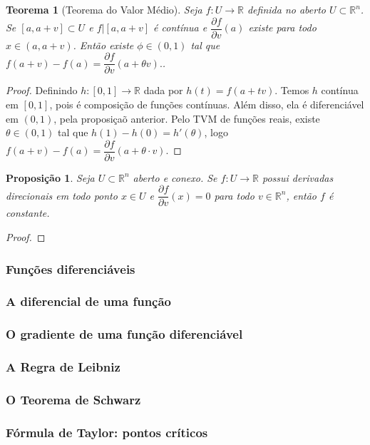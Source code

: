 \documentclass{article}
\newtheorem{prop}{Proposição}[section]
\theoremstyle{theorem}
\newtheorem{teo}{Teorema}
\theoremstyle{lemma}
\theoremstyle{definition}
\theoremstyle{remark}
\begin{document}
   \begin{teo}[Teorema do Valor Médio]
	   Seja \( f: U \to \mathbb{R}\) definida no aberto \( U \subset \mathbb{R}^n\). Se \( [a,a+v]\subset U\) e \(f|[a,a+v]\) é contínua e \( \dfrac{\partial f}{\partial v}(a)\) existe para todo \( x\in (a,a+v)\). Então existe \(\phi\in(0,1) \) tal que \( f(a+v) - f(a) = \dfrac{\partial f}{\partial v}(a+\theta v).\).
   \end{teo}
   \begin{proof}
	   Definindo \(h: [0,1] \to \mathbb{R}\) dada por \( h(t) = f(a+tv) \). Temos \(h\) contínua em \( [0,1]\), pois é composição de funções contínuas. Além disso, ela é diferenciável em \((0,1)\), pela proposiçaõ anterior. Pelo TVM de funções reais, existe \( \theta\in (0,1) \) tal que \( h(1) - h(0) = h'(\theta)\), logo \( f(a+v) - f(a) = \dfrac{\partial f}{\partial v}(a+\theta\cdot v) \).
   \end{proof}
   \begin{prop}
	   Seja \( U \subset \mathbb{R}^n \) aberto e conexo. Se \( f: U \to \mathbb{R} \) possui derivadas direcionais em todo ponto \(x\in U\) e \( \dfrac{\partial f}{\partial v} (x) = 0 \) para todo \(v\in \mathbb{R}^n \), então \(f \) é constante.
   \end{prop}
   \begin{proof}

   \end{proof}
   \subsubsection{Funções diferenciáveis}
   \subsubsection{A diferencial de uma função}
   \subsubsection{O gradiente de uma função diferenciável}
   \subsubsection{A Regra de Leibniz}
   \subsubsection{O Teorema de Schwarz}
   \subsubsection{Fórmula de Taylor: pontos críticos}
\end{document}
